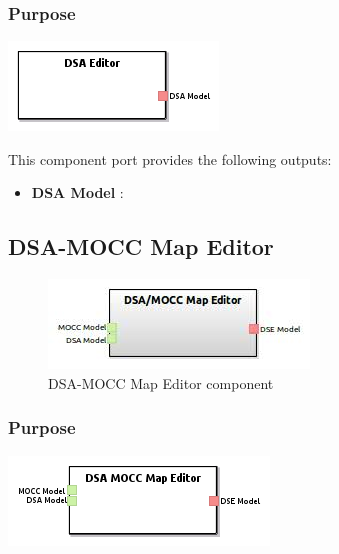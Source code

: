 \documentclass{gemoc} %
\begin{document}
\subsubsection{Purpose}

\begin{center}
\includegraphics*[trim=0.0cm 0.0cm 0cm 0.0cm, clip=true]{../images/generated/Generated_DSA_Editor.png}
\end{center}


This component port provides the following outputs:
\begin{itemize}
  \item \textbf{DSA Model} :
\end{itemize}

\subsection{DSA-MOCC Map Editor}

\begin{figure}[htp]
	\begin{center}
	\includegraphics*[trim=0.0cm 0.0cm 0cm 0.0cm, clip=true, scale=1.0]{../images/generated/Generated_DSA-MOCC Map Editor.jpg}
	\caption{DSA-MOCC Map Editor component}
	\end{center}
\end{figure}

\subsubsection{Purpose}

\begin{center}
\includegraphics*[trim=0.0cm 0.0cm 0cm 0.0cm, clip=true]{../images/generated/Generated_DSA-MOCC_Map_Editor.png}
\end{center}
\end{document}
